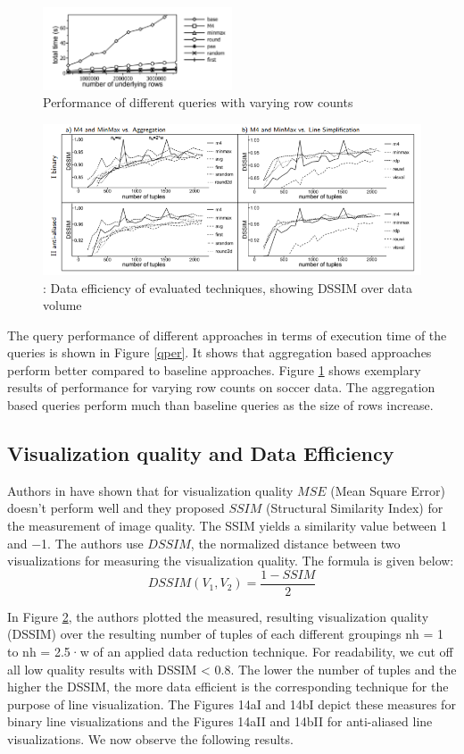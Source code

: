 \begin{figure}
	\includegraphics[width=0.5\textwidth]{pv}
	\caption{Performance of different queries with varying row counts}
	\label{vr}
\end{figure}
\begin{figure}
	\includegraphics[width=\textwidth]{dsim}
	\caption{: Data efficiency of evaluated techniques, showing DSSIM over data volume}
	\label{dsim}
\end{figure}

The query performance of different approaches in terms of execution time of the queries is shown in Figure \ref{qper}. It shows that aggregation based approaches perform better compared to baseline approaches. Figure \ref{vr} shows exemplary results of performance  for varying row counts on soccer data. The aggregation based queries perform much than baseline queries as the size of rows increase. 

\subsection{Visualization quality and Data Efficiency}
Authors in \cite{wang2004image} have shown that for visualization quality $MSE$ (Mean Square Error) doesn't perform well and they proposed $SSIM$ (Structural
Similarity Index) for the measurement of image quality. The SSIM yields a similarity
value between 1 and −1. The authors use $DSSIM$, the normalized distance between two visualizations for measuring the visualization quality. The formula is given below:
\begin{equation}
DSSIM(V_1, V_2) = \frac{1 - SSIM}{2}
\end{equation}

In Figure \ref{dsim}, the authors plotted the measured, resulting visualization
quality (DSSIM) over the resulting number of tuples of each
different groupings nh = 1 to nh = 2.5·w of an applied data
reduction technique. For readability, we cut off all low quality
results with DSSIM < 0.8. The lower the number of
tuples and the higher the DSSIM, the more data efficient is
the corresponding technique for the purpose of line visualization.
The Figures 14aI and 14bI depict these measures for
binary line visualizations and the Figures 14aII and 14bII
for anti-aliased line visualizations. We now observe the following
results.

